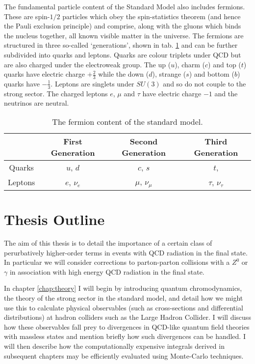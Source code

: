 	The fundamental particle content of the Standard Model also includes fermions. These are spin-$1/2$
	particles which obey the spin-statistics theorem (and hence the Pauli exclusion principle) and
	comprise, along with the gluons which binds the nucleus together, all known visible matter in the
	universe. The fermions are structured in three so-called `generations', shown in tab. \ref{tab:fermions}
	and can be further subdivided into quarks and leptons. Quarks are colour triplets under QCD but are
	also charged under the electroweak group.  The up ($u$), charm ($c$) and top ($t$) quarks have electric
	charge $+\frac{2}{3}$ while the down ($d$), strange ($s$) and bottom ($b$) quarks have $-\frac{1}{3}$.
	Leptons are singlets under $SU(3)$ and so do not couple to the strong sector.  The charged leptons
	$e$, $\mu$ and $\tau$ have electric charge $-1$ and the neutrinos are neutral.

	\begin{table}[htp!]
	\begin{center}
	\begin{tabular}{c | c | c | c}
	        & First Generation & Second Generation & Third Generation   \\ \hline
	Quarks  &  $u$, $d$        & $c$, $s$          & $t$,               \\ \hline
	Leptons &  $e$, $\nu_e$    & $\mu$, $\nu_\mu$  & $\tau$, $\nu_\tau$ \\
	\end{tabular}
	\caption{The fermion content of the standard model.}
	\label{tab:fermions}
	\end{center}
	\end{table}

\section{Thesis Outline}
	\label{sec:outline}

	The aim of this thesis is to detail the importance of a certain class of perurbatively higher-order terms
	in events with QCD radiation in the final state.  In particular we will consider corrections to parton-parton
	collisions with a $Z^0$ or $\gamma$ in association with high energy QCD radiation in the final state.

	In chapter \ref{chap:theory} I will begin by introducing quantum chromodynamics, the theory of the strong
	sector in the standard model, and detail how we might use this to calculate physical observables (such as
	cross-sections and differential distributions) at hadron colliders such as the Large Hadron Collider.  I
	will discuss how these observables fall prey to divergences in QCD-like quantum field theories with massless
	states and mention briefly how such divergences can be handled.  I will then describe how the computationally
	expensive integrals derived in subsequent chapters may be efficiently evaluated using Monte-Carlo techniques.

